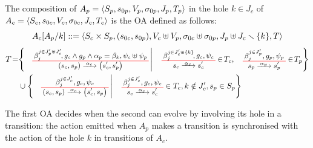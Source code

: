 \documentclass[runningheads]{llncs}
\begin{document}
\begin{definition} \label{Def:CompOA}
The composition of \(A_p = \OAg[p]\) in the hole \(k \in J_c\) of    \(A_c = \OAg[c]\) is the OA defined as follows:
\[A_c\subst{A_p}{k} ::=  \OA{S_c \times S_p}{\mpar{s_{0c}, s_{0p}}}{V_c \uplus V_p}{\sigma_{0c} \uplus \sigma_{0p}}{J_p \uplus J_c \setminus \mbrc{k}}{T} \] 
\begin{align*}
T\!=& \mset{\OT{\mpar{s_c, s_p}}{\mpar{s'_c, s'_p}}{\alpha_c}{\beta_j^{j \in J'_p \uplus J'_c}\!}{g_c \wedge g_p \wedge \alpha_p = \beta_k}{\psi_c \uplus \psi_p}}{ \OT{s_c}{s'_c}{\alpha_c}{\beta_j^{j \in J'_c \uplus \mbrc{k} }\!}{g_c}{\psi_c} \in\! T_c, \OTx{p}{}{}{p} \in\! T_p} \\
	& \cup \mset{\OT{\mpar{s_c, s_p}}{\mpar{s'_c, s_p}}{\alpha_c}{\beta_j^{j \in J'_c}}{g_c}{\psi_c}}{\OTx{c}{}{}{c} \in T_c, k \notin J'_c, s_p \in S_p}
\end{align*}
\end{definition}

The first OA decides when the second can evolve by involving its hole in a transition: the action emitted when \(A_p\) makes a transition is synchronised with the action of the hole \(k\) in transitions of \(A_c\).

\end{document}
